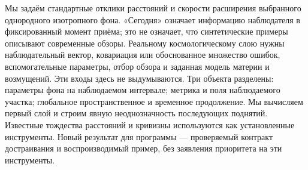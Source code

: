 {Мы задаём стандартные отклики расстояний и скорости расширения выбранного однородного изотропного фона. «Сегодня» означает информацию наблюдателя в фиксированный момент приёма; это не означает, что синтетические примеры описывают современные обзоры. Реальному космологическому слою нужны наблюдательный вектор, ковариация или обоснованное множество ошибок, вспомогательные параметры, отбор обзора и заданная модель материи и возмущений. Эти входы здесь не выдумываются.}
{Три объекта разделены: параметры фона на наблюдаемом интервале; метрика и поля наблюдаемого участка; глобальное пространственное и временное продолжение. Мы вычисляем первый слой и строим явную неоднозначность последующих поднятий. Известные тождества расстояний и кривизны \cite{Hogg,CBL} используются как установленные инструменты. Новый результат для программы --- проверяемый контракт достраивания и воспроизводимый пример, без заявления приоритета на эти инструменты.}

